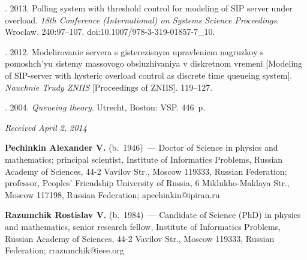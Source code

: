 \begin{multicols}{2}
{{\begin{thebibliography}{99}
. 2013.
Polling system with threshold control for modeling of
SIP server under overload. \textit{18th  Conference (International) on
Systems Science Proceedings}. Wroclaw. 240:97--107.
doi:10.1007/978-3-319-01857-7\_10.



. 2012.
Modelirovanie servera s giste\-re\-zis\-nym upravleniem
nagruzkoy s pomoshch'yu sistemy massovogo
obsluzhivaniya v diskretnom vremeni [Modeling of
SIP-server with hysteric overload control as
discrete time queueing system]. \textit{Nauchnie Trudy ZNIIS}
[Proceedings of ZNIIS]. 119--127.

. 2004.
\textit{Queueing theory}. Utrecht, Boston: VSP. 446~p.

\end{thebibliography}
} }


\end{multicols}

\vspace*{-6pt}

\hfill{\small\textit{Received April 2, 2014}}

\vspace*{-18pt}





\Contr

\noindent
\textbf{Pechinkin Alexander V.} (b.\ 1946)~--- Doctor
of Science in physics and mathematics; principal
scientist, Institute of Informatics Problems,
Russian Academy of Sciences, 44-2 Vavilov Str.,
Moscow 119333, Russian Federation; professor,
Peoples' Friendship University of Russia, 6 Miklukho-Maklaya Str.,
Moscow 117198, Russian Federation; apechinkin@ipiran.ru

\vspace*{3pt}

\noindent
\textbf{Razumchik Rostislav V.} (b.\ 1984)~--- Candidate
of Science (PhD) in physics and mathematics,
senior research fellow, Institute of Informatics
Problems, Russian Academy of Sciences, 44-2 Vavilov Str.,
Moscow 119333, Russian Federation; rrazumchik@ieee.org

 \label{end\stat}

\renewcommand{\bibname}{\protect\rm Литература} 